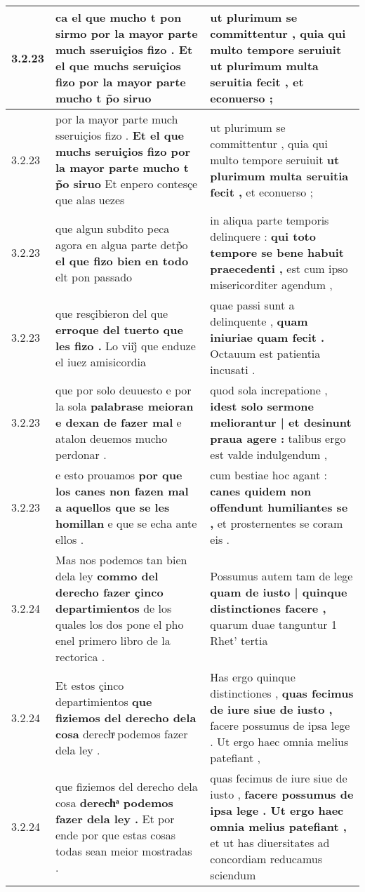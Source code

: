\begin{tabular}{|p{1cm}|p{6.5cm}|p{6.5cm}|}
3.2.23 & ca el que mucho t pon sirmo \textbf{ por la mayor parte much sseruiçios fizo . } Et el que muchs seruiçios fizo por la mayor parte mucho t p̃o siruo & ut plurimum se committentur , quia qui multo tempore seruiuit \textbf{ ut plurimum multa seruitia fecit , } et econuerso ; \\\hline
3.2.23 & por la mayor parte much sseruiçios fizo . \textbf{ Et el que muchs seruiçios fizo por la mayor parte mucho t p̃o siruo } Et enpero contesçe que alas uezes & ut plurimum se committentur , quia qui multo tempore seruiuit \textbf{ ut plurimum multa seruitia fecit , } et econuerso ; \\\hline
3.2.23 & que algun subdito peca agora en algua parte detp̃o \textbf{ el que fizo bien en todo } elt pon passado & in aliqua parte temporis delinquere : \textbf{ qui toto tempore se bene habuit praecedenti , } est cum ipso misericorditer agendum , \\\hline
3.2.23 & que resçibieron del que \textbf{ erroque del tuerto que les fizo . } Lo viij̊ que enduze el iuez amisicordia & quae passi sunt a delinquente , \textbf{ quam iniuriae quam fecit . } Octauum est patientia incusati . \\\hline
3.2.23 & que por solo deuuesto e por la sola \textbf{ palabrase meioran e dexan de fazer mal } e atalon deuemos mucho perdonar . & quod sola increpatione , \textbf{ idest solo sermone meliorantur | et desinunt praua agere : } talibus ergo est valde indulgendum , \\\hline
3.2.23 & e esto prouamos \textbf{ por que los canes non fazen mal a aquellos que se les homillan } e que se echa ante ellos . & cum bestiae hoc agant : \textbf{ canes quidem non offendunt humiliantes se , } et prosternentes se coram eis . \\\hline
3.2.24 & Mas nos podemos tan bien dela ley \textbf{ commo del derecho fazer çinco departimientos } de los quales los dos pone el pho enel primero libro de la rectorica . & Possumus autem tam de lege \textbf{ quam de iusto | quinque distinctiones facere , } quarum duae tanguntur 1 Rhet’ tertia \\\hline
3.2.24 & Et estos çinco departimientos \textbf{ que fiziemos del derecho dela cosa } derechͣ podemos fazer dela ley . & Has ergo quinque distinctiones , \textbf{ quas fecimus de iure siue de iusto , } facere possumus de ipsa lege . Ut ergo haec omnia melius patefiant , \\\hline
3.2.24 & que fiziemos del derecho dela cosa \textbf{ derechͣ podemos fazer dela ley . } Et por ende por que estas cosas todas sean meior mostradas . & quas fecimus de iure siue de iusto , \textbf{ facere possumus de ipsa lege . Ut ergo haec omnia melius patefiant , } et ut has diuersitates ad concordiam reducamus sciendum \\\hline

\end{tabular}
